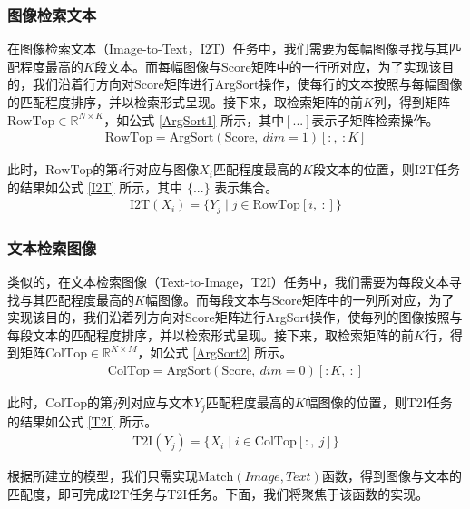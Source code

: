 \documentclass[a4paper]{zreport}
\begin{document}
\subsubsection{图像检索文本}

在图像检索文本（Image-to-Text，I2T）任务中，我们需要为每幅图像寻找与其匹配程度最高的$K$段文本。而每幅图像与$\mathrm{Score}$矩阵中的一行所对应，为了实现该目的，我们沿着行方向对$\mathrm{Score}$矩阵进行ArgSort操作，使每行的文本按照与每幅图像的匹配程度排序，并以检索形式呈现。接下来，取检索矩阵的前$K$列，得到矩阵$\mathrm{RowTop} \in \mathbb{R}^{N \times K}$，如公式 \eqref{ArgSort1} 所示，其中$\left[...\right]$表示子矩阵检索操作。
\begin{gather}
\mathrm{RowTop} = \mathrm{ArgSort}\left(\mathrm{Score},~dim=1\right)\left[:,~:K\right]
\label{ArgSort1}
\end{gather}

此时，$\mathrm{RowTop}$的第$i$行对应与图像$X_i$匹配程度最高的$K$段文本的位置，则I2T任务的结果如公式 \eqref{I2T} 所示，其中 $\{...\}$ 表示集合。
\begin{gather}
\mathrm{I2T}\left(X_i\right) = \{Y_j\mid j \in \mathrm{RowTop}\left[i,~:\right]\}\label{I2T}
\end{gather}

\subsubsection{文本检索图像}

类似的，在文本检索图像（Text-to-Image，T2I）任务中，我们需要为每段文本寻找与其匹配程度最高的$K$幅图像。而每段文本与$\mathrm{Score}$矩阵中的一列所对应，为了实现该目的，我们沿着列方向对$\mathrm{Score}$矩阵进行ArgSort操作，使每列的图像按照与每段文本的匹配程度排序，并以检索形式呈现。接下来，取检索矩阵的前$K$行，得到矩阵$\mathrm{ColTop} \in \mathbb{R}^{K \times M}$，如公式 \eqref{ArgSort2} 所示。
\begin{gather}
\mathrm{ColTop} = \mathrm{ArgSort}\left(\mathrm{Score},~dim=0\right)\left[:K,~:\right]
\label{ArgSort2}
\end{gather}

此时，$\mathrm{ColTop}$的第$j$列对应与文本$Y_j$匹配程度最高的$K$幅图像的位置，则T2I任务的结果如公式 \eqref{T2I} 所示。
\begin{gather}
\mathrm{T2I}\left(Y_j\right) = \{X_i\mid i \in \mathrm{ColTop}\left[:,~j\right]\}\label{T2I}
\end{gather}

根据所建立的模型，我们只需实现$\mathrm{Match}\left(Image, Text\right)$函数，得到图像与文本的匹配度，即可完成I2T任务与T2I任务。下面，我们将聚焦于该函数的实现。
\end{document}
